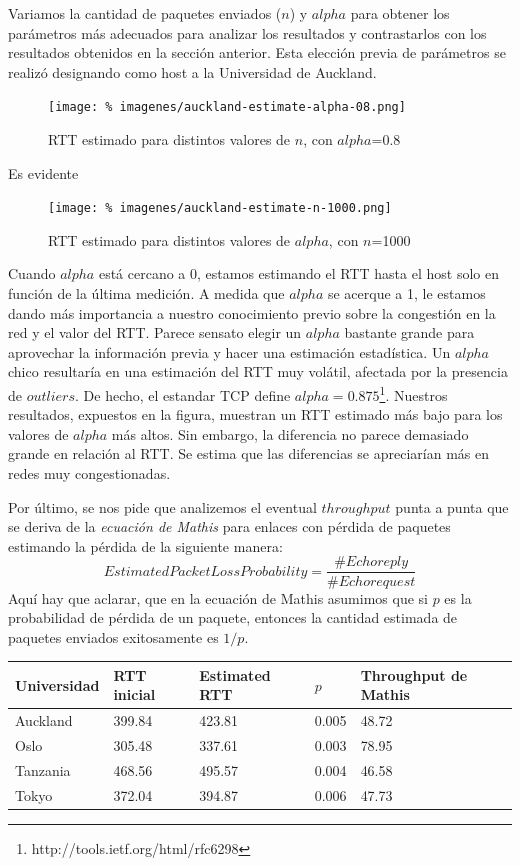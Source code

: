 \documentclass[final,inline,a4paper,narroweqnarray]{ieee}
\begin{document}
Variamos la cantidad de paquetes enviados ($n$) y $alpha$ para obtener los parámetros más
adecuados para analizar los resultados y contrastarlos con los resultados obtenidos en la sección anterior.
Esta elección previa de parámetros se realizó designando como host a la Universidad de Auckland.

\begin{figure}[ht]\begin{center}
   \texttt{[image: \%
    imagenes/auckland-estimate-alpha-08.png]}
    \caption{RTT estimado para distintos valores de $n$, con $alpha$=0.8}
    \label{fig:auckland-estimate-alpha-08}
\end{center}\end{figure}

Es evidente

\begin{figure}[ht]\begin{center}
   \texttt{[image: \%
    imagenes/auckland-estimate-n-1000.png]}
    \caption{RTT estimado para distintos valores de $alpha$, con $n$=1000}
    \label{fig:auckland-estimate-n-1000}
\end{center}\end{figure}

Cuando $alpha$ está cercano a 0, estamos estimando el RTT hasta el host solo en función de la última medición. A medida que $alpha$ se acerque a 1, le estamos dando más importancia a nuestro conocimiento previo sobre la congestión en la red y el valor del RTT. Parece sensato elegir un $alpha$ bastante grande para aprovechar la información previa y hacer una estimación estadística. Un $alpha$ chico resultaría en una estimación del RTT muy volátil, afectada por la presencia de $outliers$.
De hecho, el estandar TCP define $alpha=0.875$\footnote{http://tools.ietf.org/html/rfc6298}.
Nuestros resultados, expuestos en la figura, muestran un RTT estimado más bajo para los valores de $alpha$ más altos. Sin embargo, la diferencia no parece demasiado grande en relación al RTT. Se estima que las diferencias se apreciarían más en redes muy congestionadas.

Por último, se nos pide que analizemos el eventual $throughput$ punta a punta
que se deriva de la \emph{ecuación de Mathis} para enlaces con pérdida de
paquetes estimando la pérdida de la siguiente manera:
\[
EstimatedPacketLossProbability = \dfrac{\#Echo reply}{\#Echo request}
\]
Aquí hay que aclarar, que en la ecuación de Mathis asumimos que si $p$ es la
probabilidad de pérdida de un paquete, entonces la cantidad estimada de paquetes
enviados exitosamente es $1/p$.

\begin{tabular}{| p{1.6cm} | p{1.2cm} | p{1.4cm} | p{1.2cm} | p{1.7cm} |}
  \hline
  Universidad & RTT inicial & Estimated RTT & $p$ & Throughput de Mathis \\
  \hline
  Auckland & 399.84 & 423.81 & 0.005 & 48.72 \\
  Oslo & 305.48 & 337.61 & 0.003 & 78.95 \\
  Tanzania & 468.56 & 495.57 & 0.004 & 46.58 \\
  Tokyo & 372.04 & 394.87 & 0.006 & 47.73 \\
  \hline
\end{tabular}
\end{document}

